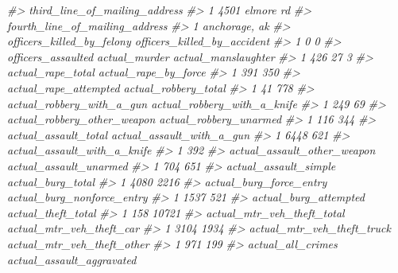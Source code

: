 \documentclass[
  12pt,
  openany]{book}
\newenvironment{Shaded}{\begin{snugshade}}{\end{snugshade}}
\newcommand{\CommentTok}[1]{\textcolor[rgb]{0.37,0.37,0.37}{\textit{#1}}}
\begin{document}
\begin{Shaded}
\begin{Highlighting}[]
\CommentTok{\#\textgreater{}   third\_line\_of\_mailing\_address}
\CommentTok{\#\textgreater{} 1                4501 elmore rd}
\CommentTok{\#\textgreater{}   fourth\_line\_of\_mailing\_address}
\CommentTok{\#\textgreater{} 1                  anchorage, ak}
\CommentTok{\#\textgreater{}   officers\_killed\_by\_felony officers\_killed\_by\_accident}
\CommentTok{\#\textgreater{} 1                         0                           0}
\CommentTok{\#\textgreater{}   officers\_assaulted actual\_murder actual\_manslaughter}
\CommentTok{\#\textgreater{} 1                426            27                   3}
\CommentTok{\#\textgreater{}   actual\_rape\_total actual\_rape\_by\_force}
\CommentTok{\#\textgreater{} 1               391                  350}
\CommentTok{\#\textgreater{}   actual\_rape\_attempted actual\_robbery\_total}
\CommentTok{\#\textgreater{} 1                    41                  778}
\CommentTok{\#\textgreater{}   actual\_robbery\_with\_a\_gun actual\_robbery\_with\_a\_knife}
\CommentTok{\#\textgreater{} 1                       249                          69}
\CommentTok{\#\textgreater{}   actual\_robbery\_other\_weapon actual\_robbery\_unarmed}
\CommentTok{\#\textgreater{} 1                         116                    344}
\CommentTok{\#\textgreater{}   actual\_assault\_total actual\_assault\_with\_a\_gun}
\CommentTok{\#\textgreater{} 1                 6448                       621}
\CommentTok{\#\textgreater{}   actual\_assault\_with\_a\_knife}
\CommentTok{\#\textgreater{} 1                         392}
\CommentTok{\#\textgreater{}   actual\_assault\_other\_weapon actual\_assault\_unarmed}
\CommentTok{\#\textgreater{} 1                         704                    651}
\CommentTok{\#\textgreater{}   actual\_assault\_simple actual\_burg\_total}
\CommentTok{\#\textgreater{} 1                  4080              2216}
\CommentTok{\#\textgreater{}   actual\_burg\_force\_entry actual\_burg\_nonforce\_entry}
\CommentTok{\#\textgreater{} 1                    1537                        521}
\CommentTok{\#\textgreater{}   actual\_burg\_attempted actual\_theft\_total}
\CommentTok{\#\textgreater{} 1                   158              10721}
\CommentTok{\#\textgreater{}   actual\_mtr\_veh\_theft\_total actual\_mtr\_veh\_theft\_car}
\CommentTok{\#\textgreater{} 1                       3104                     1934}
\CommentTok{\#\textgreater{}   actual\_mtr\_veh\_theft\_truck actual\_mtr\_veh\_theft\_other}
\CommentTok{\#\textgreater{} 1                        971                        199}
\CommentTok{\#\textgreater{}   actual\_all\_crimes actual\_assault\_aggravated}

\end{Highlighting}
\end{Shaded}
\end{document}
